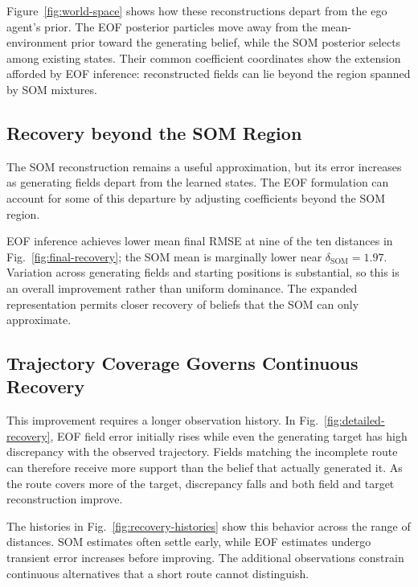 \documentclass[letterpaper,10pt,conference]{ieeeconf}
\begin{document}
Figure~\ref{fig:world-space} shows how these reconstructions depart from the ego agent's prior. The EOF posterior particles move away from the mean-environment prior toward the generating belief, while the SOM posterior selects among existing states. Their common coefficient coordinates show the extension afforded by EOF inference: reconstructed fields can lie beyond the region spanned by SOM mixtures.

\subsection{Recovery beyond the SOM Region}



The SOM reconstruction remains a useful approximation, but its error increases as generating fields depart from the learned states. The EOF formulation can account for some of this departure by adjusting coefficients beyond the SOM region.

EOF inference achieves lower mean final RMSE at nine of the ten distances in Fig.~\ref{fig:final-recovery}; the SOM mean is marginally lower near $\delta_{\mathrm{SOM}}=1.97$. Variation across generating fields and starting positions is substantial, so this is an overall improvement rather than uniform dominance. The expanded representation permits closer recovery of beliefs that the SOM can only approximate.

\subsection{Trajectory Coverage Governs Continuous Recovery}

This improvement requires a longer observation history. In Fig.~\ref{fig:detailed-recovery}, EOF field error initially rises while even the generating target has high discrepancy with the observed trajectory. Fields matching the incomplete route can therefore receive more support than the belief that actually generated it. As the route covers more of the target, discrepancy falls and both field and target reconstruction improve.



The histories in Fig.~\ref{fig:recovery-histories} show this behavior across the range of distances. SOM estimates often settle early, while EOF estimates undergo transient error increases before improving. The additional observations constrain continuous alternatives that a short route cannot distinguish.
\end{document}
